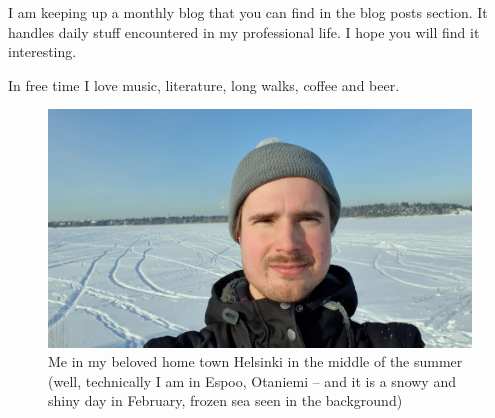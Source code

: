 \documentclass{article}
\begin{document}





        I am keeping up a monthly blog that you can find in the blog posts section. It handles daily stuff encountered in my professional life. I hope you will find it interesting. 

        In free time I love music, literature, long walks, coffee and beer.
        

        \begin{figure}
          \includegraphics[width=\linewidth]{me1.jpg}
          \caption{Me in my beloved home town Helsinki in the middle of the summer (well, technically I am in Espoo, Otaniemi – and it is a snowy and shiny day in February, frozen sea seen in the background)}
        \end{figure}
\end{document}
